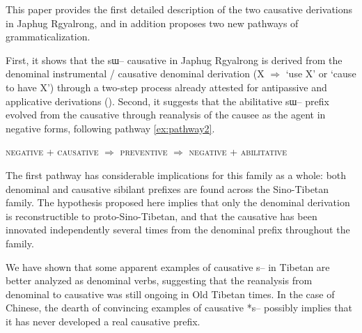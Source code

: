 \documentclass[oldfontcommands,oneside,a4paper,11pt]{article}
\newcommand{\ipa}[1]{{\phon \mbox{#1}}} %
\begin{document}
This paper   provides the first detailed description of the two causative derivations in Japhug Rgyalrong, and in addition  proposes two new pathways of grammaticalization.

 First, it shows that the \ipa{sɯ--} causative in Japhug Rgyalrong is derived from the denominal instrumental  / causative denominal derivation (X $\Rightarrow$ `use X' or `cause to have X') through a two-step process already attested for antipassive and applicative derivations (\citealt{jacques14antipassive}). Second, it   suggests that the abilitative \ipa{sɯ--} prefix evolved from the causative through reanalysis of the causee as the agent in negative forms, following pathway \ref{ex:pathway2}.
 
{\small
\begin{exe}
\ex \label{ex:pathway2}
\glt \textsc{negative}   + \textsc{causative} $\Rightarrow$ \textsc{preventive} $\Rightarrow$ \textsc{negative} +  \textsc{abilitative} 
\end{exe}
}

The first pathway has considerable implications for this family as a whole: both denominal and causative sibilant prefixes are found across the Sino-Tibetan family. The hypothesis proposed here implies that only the denominal derivation is reconstructible to proto-Sino-Tibetan, and that the causative has been innovated independently several times from the denominal prefix throughout the family. 

We have shown that  some apparent examples of causative \ipa{s--} in Tibetan are better analyzed as denominal verbs, suggesting that the reanalysis from denominal to causative was still ongoing in Old Tibetan times. In the case of Chinese, the dearth of convincing examples of causative *\ipa{s--} possibly implies that it has never developed a real causative prefix.



\end{document}
